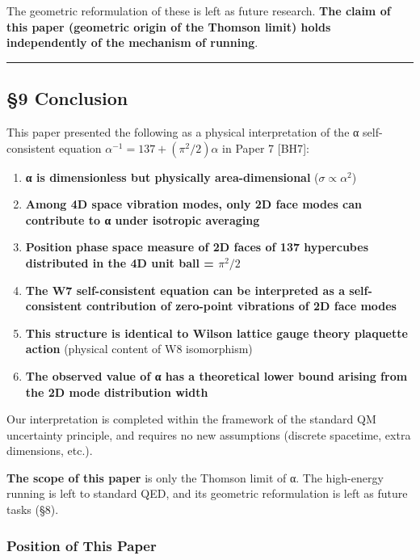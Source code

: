 \documentclass[
  11pt]{article}
\providecommand{\tightlist}{%
  \setlength{\itemsep}{0pt}\setlength{\parskip}{0pt}}
\begin{document}
The geometric reformulation of these is left as future research.
\textbf{The claim of this paper (geometric origin of the Thomson limit)
holds independently of the mechanism of running}.

\begin{center}\rule{0.5\linewidth}{0.5pt}\end{center}

\subsection{§9 Conclusion}\label{conclusion}

This paper presented the following as a physical interpretation of the α
self-consistent equation \(\alpha^{-1} = 137 + (\pi^2/2)\alpha\) in
Paper 7 {[}BH7{]}:

\begin{enumerate}
\def\labelenumi{\arabic{enumi}.}
\tightlist
\item
  \textbf{α is dimensionless but physically area-dimensional}
  (\(\sigma \propto \alpha^2\))
\item
  \textbf{Among 4D space vibration modes, only 2D face modes can
  contribute to α under isotropic averaging}
\item
  \textbf{Position phase space measure of 2D faces of 137 hypercubes
  distributed in the 4D unit ball = \(\pi^2/2\)}
\item
  \textbf{The W7 self-consistent equation can be interpreted as a
  self-consistent contribution of zero-point vibrations of 2D face
  modes}
\item
  \textbf{This structure is identical to Wilson lattice gauge theory
  plaquette action} (physical content of W8 isomorphism)
\item
  \textbf{The observed value of α has a theoretical lower bound arising
  from the 2D mode distribution width}
\end{enumerate}

Our interpretation is completed within the framework of the standard QM
uncertainty principle, and requires no new assumptions (discrete
spacetime, extra dimensions, etc.).

\textbf{The scope of this paper} is only the Thomson limit of α. The
high-energy running is left to standard QED, and its geometric
reformulation is left as future tasks (§8).

\subsubsection{Position of This Paper}\label{position-of-this-paper-1}
\end{document}
